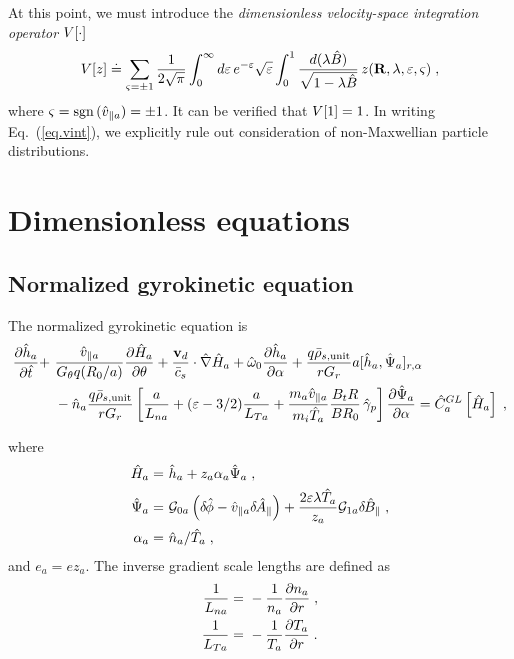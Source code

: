 At this point, we must introduce the {\it dimensionless 
velocity-space integration operator} $V[\cdot]$
%
\begin{equation}
V[z] \doteq \sum_{{\varsigma}=\pm 1} \frac{1}{2\sqrt{\pi}}
\int_0^\infty  d{\varepsilon} \, e^{-{\varepsilon}} \sqrt{{\varepsilon}} 
\int_0^1 \frac{d(\lambda\hat{B})}{\sqrt{1-\lambda\hat{B}}} 
\, z(\mathbf{R},\lambda,{\varepsilon},{\varsigma}) \; ,
\label{eq.vint}
\end{equation}
%
where ${\varsigma} = {\rm sgn}\,(\hat{v}_{\parallel a}) = \pm 1$.  It can be verified 
that $V[1]=1$.  In writing Eq.~(\ref{eq.vint}), we explicitly 
rule out consideration of non-Maxwellian particle distributions.

\section{Dimensionless equations}

\subsection{Normalized gyrokinetic equation}

The normalized gyrokinetic equation is
%
\begin{align}
\frac{\partial\hat{h}_a}{\partial\hat{t}} 
+ &~\frac{\hat{v}_{\parallel a}}{G_\theta q (R_0/a)} \frac{\partial \hat{H}_a}{\partial\theta} 
+ \frac{\mathbf{v}_d}{\bar{c}_s} \cdot \hat{\nabla} \hat{H}_a
+ \hat{\omega}_0 \frac{\partial\hat{h}_a}{\partial\alpha}
+ \frac{q \bar{\rho}_{s,{\rm unit}}}{r G_r} a [\hat{h}_a,\hat{\Psi}_a]_{r,\alpha} \nonumber \\
 &~ - {\hat n}_a \frac{q\bar{\rho}_{s,{\rm unit}}}{r G_r} 
 \left[ \frac{a}{L_{na}} + ({\varepsilon}-3/2) \frac{a}{L_{Ta}} 
 + \frac{m_a \hat{v}_{\parallel a}}{m_i \hat{T}_a} \frac{B_t R}{B R_0} \, \hat{\gamma}_p \right] 
 \frac{\partial \hat{\Psi}_a}{\partial\alpha} 
= \hat{C}_a^{GL}\left[\hat{H}_a\right] \; ,
\end{align}

\noindent
where
%
\begin{align}
\hat{H}_a = &~\hat{h}_a + z_a \alpha_a \hat{\Psi}_a \; , \\
\hat{\Psi}_a = &~{\cal G}_{0a} \left( \delta \hskip -1pt \hat{\phi} - \hat{v}_{\parallel a} \delta \hskip -1pt \hat{A}_\parallel \right) + 
\frac{2 \varepsilon \lambda \hat{T}_a}{z_a} {\cal G}_{1a}\delta \hskip -1pt \hat{B}_\parallel \; , \\ 
\alpha_a = &~\hat{n}_a/\hat{T}_a \; , 
\end{align}
%
and $e_a = e z_a$.  The inverse gradient scale lengths are defined as 
%
\begin{align}
\frac{1}{L_{na}} = &~-\frac{1}{n_a}\frac{\partial n_a}{\partial r} \; , \\
\frac{1}{L_{Ta}} = &~-\frac{1}{T_a}\frac{\partial T_a}{\partial r} \; .
\end{align}

